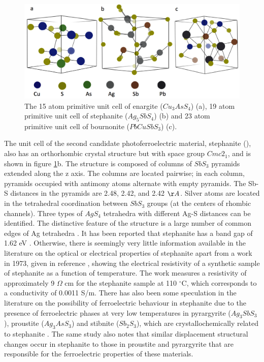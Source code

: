 \begin{figure}[h!]
  \centering
    \includegraphics[width=1.0\textwidth]{figures/unit_cells.png}
    \caption{The 15 atom primitive unit cell of enargite ($Cu_{3}AsS_{4}$) (a), 19 atom primitive unit cell of stephanite ($Ag_{5}SbS_{4}$) (b) and 23 atom primitive unit cell of bournonite ($PbCuSbS_{3}$) (c).}
  \label{unit_cells}
\end{figure}

The unit cell of the second candidate photoferroelectric material, stephanite (\stephanite), also has an orthorhombic crystal structure but with space group $Cmc2_1$, and is shown in figure \ref{unit_cells}b. 
The structure is composed of columns of $SbS_3$ pyramids extended along the z axis. The columns are located pairwise; in each column, pyramids occupied with antimony atoms alternate with empty pyramids. The Sb-S distances in the pyramids are 2.48, 2.42, and 2.42 $\AA$. Silver atoms are located in the tetrahedral coordination between $SbS_3$ groups (at the centers of rhombic channels). Three types of $AgS_4$ tetrahedra with different Ag-S distances can be identified. The distinctive feature of the structure is a large number of common edges of Ag tetrahedra \cite{stephanite}.
It has been reported that stephanite has a band gap of 1.62 eV \cite{Dittrich1}. Otherwise, there is seemingly very little information available in the literature on the optical or electrical properties of stephanite apart from a work in 1973, given in reference , showing the electrical resistivity of a synthetic sample of stephanite as a function of temperature. The work measures a resistivity of approximately 9 $\Omega$ cm for the stephanite sample at 110 $^\circ$C, which corresponds to a conductivity of 0.0011 S/m. There has also been some speculation in the literature on the possibility of ferroelectric behaviour in stephanite due to the presence of ferroelectric phases at very low temperatures in pyrargyrite ($Ag_3SbS_3$), proustite ($Ag_3AsS_3$) and stibnite ($Sb_2S_3$), which are crystallochemically related to stephanite \cite{stephanite}. The same study also notes that similar displacement structural changes occur in stephanite to those in proustite and pyrargyrite that are responsible for the ferroelectric properties of these materials.\\

